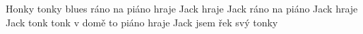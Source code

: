 \begin{TEXT}{Honky tonky blues}
\SLOKA* {} ráno na piáno
hraje Jack hraje Jack
 ráno na piáno
 Jack hraje Jack
 tonk  tonk
  
\SLOKA* {} v domě 
 to piáno 
 hraje Jack
 jsem řek
svý  tonky 
\end{TEXT}
